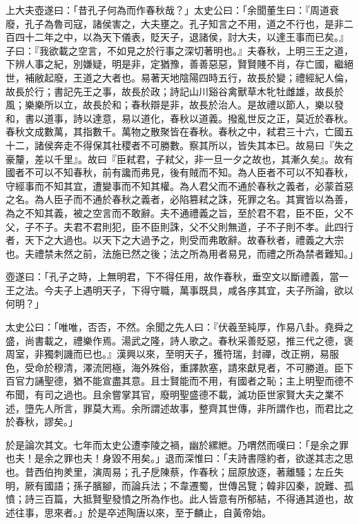 \begin{pinyinscope}
上大夫壺遂曰：「昔孔子何為而作春秋哉？」太史公曰：「余聞董生曰：『周道衰廢，孔子為魯司寇，諸侯害之，大夫壅之。孔子知言之不用，道之不行也，是非二百四十二年之中，以為天下儀表，貶天子，退諸侯，討大夫，以達王事而已矣。』子曰：『我欲載之空言，不如見之於行事之深切著明也。』夫春秋，上明三王之道，下辨人事之紀，別嫌疑，明是非，定猶豫，善善惡惡，賢賢賤不肖，存亡國，繼絕世，補敝起廢，王道之大者也。易著天地陰陽四時五行，故長於變；禮經紀人倫，故長於行；書記先王之事，故長於政；詩記山川谿谷禽獸草木牝牡雌雄，故長於風；樂樂所以立，故長於和；春秋辯是非，故長於治人。是故禮以節人，樂以發和，書以道事，詩以達意，易以道化，春秋以道義。撥亂世反之正，莫近於春秋。春秋文成數萬，其指數千。萬物之散聚皆在春秋。春秋之中，弒君三十六，亡國五十二，諸侯奔走不得保其社稷者不可勝數。察其所以，皆失其本已。故易曰『失之豪釐，差以千里』。故曰『臣弒君，子弒父，非一旦一夕之故也，其漸久矣』。故有國者不可以不知春秋，前有讒而弗見，後有賊而不知。為人臣者不可以不知春秋，守經事而不知其宜，遭變事而不知其權。為人君父而不通於春秋之義者，必蒙首惡之名。為人臣子而不通於春秋之義者，必陷篡弒之誅，死罪之名。其實皆以為善，為之不知其義，被之空言而不敢辭。夫不通禮義之旨，至於君不君，臣不臣，父不父，子不子。夫君不君則犯，臣不臣則誅，父不父則無道，子不子則不孝。此四行者，天下之大過也。以天下之大過予之，則受而弗敢辭。故春秋者，禮義之大宗也。夫禮禁未然之前，法施已然之後；法之所為用者易見，而禮之所為禁者難知。」

壺遂曰：「孔子之時，上無明君，下不得任用，故作春秋，垂空文以斷禮義，當一王之法。今夫子上遇明天子，下得守職，萬事既具，咸各序其宜，夫子所論，欲以何明？」

太史公曰：「唯唯，否否，不然。余聞之先人曰：『伏羲至純厚，作易八卦。堯舜之盛，尚書載之，禮樂作焉。湯武之隆，詩人歌之。春秋采善貶惡，推三代之德，褒周室，非獨刺譏而已也。』漢興以來，至明天子，獲符瑞，封禪，改正朔，易服色，受命於穆清，澤流罔極，海外殊俗，重譯款塞，請來獻見者，不可勝道。臣下百官力誦聖德，猶不能宣盡其意。且士賢能而不用，有國者之恥；主上明聖而德不布聞，有司之過也。且余嘗掌其官，廢明聖盛德不載，滅功臣世家賢大夫之業不述，墮先人所言，罪莫大焉。余所謂述故事，整齊其世傳，非所謂作也，而君比之於春秋，謬矣。」

於是論次其文。七年而太史公遭李陵之禍，幽於縲紲。乃喟然而嘆曰：「是余之罪也夫！是余之罪也夫！身毀不用矣。」退而深惟曰：「夫詩書隱約者，欲遂其志之思也。昔西伯拘羑里，演周易；孔子戹陳蔡，作春秋；屈原放逐，著離騷；左丘失明，厥有國語；孫子臏腳，而論兵法；不韋遷蜀，世傳呂覽；韓非囚秦，說難、孤憤；詩三百篇，大抵賢聖發憤之所為作也。此人皆意有所郁結，不得通其道也，故述往事，思來者。」於是卒述陶唐以來，至于麟止，自黃帝始。


\end{pinyinscope}
